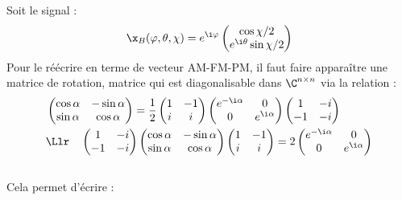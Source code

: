 Soit le signal :
\[\x_B(\varphi, \theta, \chi) = e^{\i \varphi} \begin{pmatrix}
	\cos \chi/2 \\ e^{\i \theta}\sin\chi/2\end{pmatrix}\]
Pour le réécrire en terme de vecteur AM-FM-PM, il faut faire apparaître une matrice de rotation, matrice qui est diagonalisable dans $\C^{n\times n}$ via la relation :
\begin{align*}
	&\begin{pmatrix} 
		\cos \alpha & -\sin \alpha \\ 
		\sin\alpha & \cos\alpha 
	\end{pmatrix} = \frac{1}{2} \begin{pmatrix} 
		1 & -1 \\ i & i
	\end{pmatrix}\begin{pmatrix} 
		e^{-\i \alpha} & 0 \\ 
		0 & e^{\i \alpha} 
	\end{pmatrix}\begin{pmatrix} 
		1 & -i \\ -1 & -i
	\end{pmatrix}\\
	&\Llr\quad \begin{pmatrix} 
		1 & -i \\ -1 & -i
	\end{pmatrix}\begin{pmatrix} 
		\cos \alpha & -\sin \alpha \\ 
		\sin\alpha & \cos\alpha 
	\end{pmatrix} \begin{pmatrix} 
		1 & -1 \\ i & i
	\end{pmatrix} = 2 \begin{pmatrix} 
		e^{-\i \alpha} & 0 \\ 
		0 & e^{\i \alpha} 
	\end{pmatrix}
\end{align*}
\\
Cela permet d'écrire :
